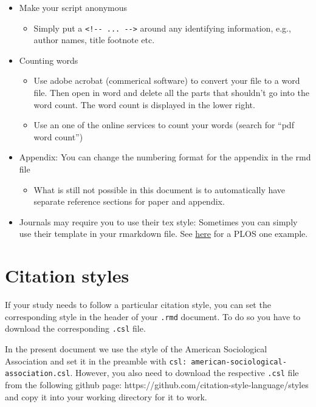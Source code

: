\documentclass[
  letterpaper,
  DIV=11,
  numbers=noendperiod]{scrartcl}
\providecommand{\tightlist}{%
  \setlength{\itemsep}{0pt}\setlength{\parskip}{0pt}}\usepackage{longtable,booktabs,array}
\begin{document}
\begin{itemize}
\tightlist
\item
  Make your script anonymous

  \begin{itemize}
  \tightlist
  \item
    Simply put a \texttt{\textless{}!-\/-\ ...\ -\/-\textgreater{}}
    around any identifying information, e.g., author names, title
    footnote etc.
  \end{itemize}
\item
  Counting words

  \begin{itemize}
  \tightlist
  \item
    Use adobe acrobat (commerical software) to convert your file to a
    word file. Then open in word and delete all the parts that shouldn't
    go into the word count. The word count is displayed in the lower
    right.
  \item
    Use an one of the online services to count your words (search for
    ``pdf word count'')
  \end{itemize}
\item
  Appendix: You can change the numbering format for the appendix in the
  rmd file

  \begin{itemize}
  \tightlist
  \item
    What is still not possible in this document is to automatically have
    separate reference sections for paper and appendix.
  \end{itemize}
\item
  Journals may require you to use their tex style: Sometimes you can
  simply use their template in your rmarkdown file. See
  \href{https://dataverse.harvard.edu/dataset.xhtml?persistentId=doi:10.7910/DVN/LDUMNY}{here}
  for a PLOS one example.
\end{itemize}

\hypertarget{citation-styles}{%
\section{Citation styles}\label{citation-styles}}

If your study needs to follow a particular citation style, you can set
the corresponding style in the header of your \texttt{.rmd} document. To
do so you have to download the corresponding \texttt{.csl} file.

In the present document we use the style of the American Sociological
Association and set it in the preamble with
\texttt{csl:\ american-sociological-association.csl}. However, you also
need to download the respective \texttt{.csl} file from the following
github page: https://github.com/citation-style-language/styles and copy
it into your working directory for it to work.
\end{document}
